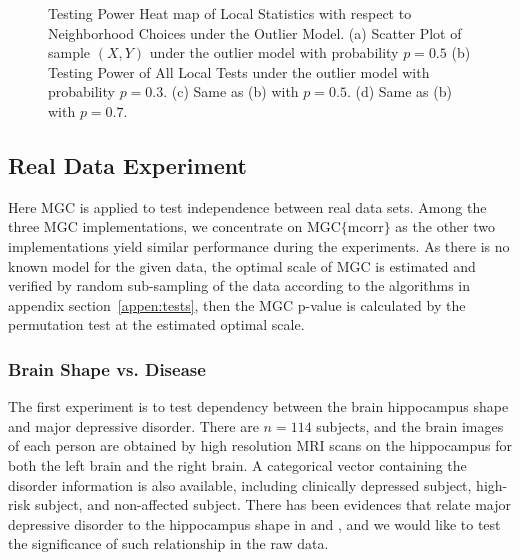 \documentclass[11pt]{article}
\begin{document}
\begin{figure}[htbp]
{}
\hfil
{}
\caption{Testing Power Heat map of Local Statistics with respect to Neighborhood Choices under the Outlier Model.
(a) Scatter Plot of sample $(X,Y)$ under the outlier model with probability $p=0.5$
(b) Testing Power of All Local Tests under the outlier model with probability $p=0.3$.
(c) Same as (b) with $p=0.5$.
(d) Same as (b) with $p=0.7$.
}
\label{figSim3}
\end{figure}

\subsection{Real Data Experiment}
\label{numer3}
Here MGC is applied to test independence between real data sets. Among the three MGC implementations, we concentrate on MGC$\{$mcorr$\}$ as the other two implementations yield similar performance during the experiments. As there is no known model for the given data, the optimal scale of MGC is estimated and verified by random sub-sampling of the data according to the algorithms in appendix section~\ref{appen:tests}, then the MGC p-value is calculated by the permutation test at the estimated optimal scale.

\subsubsection{Brain Shape vs. Disease}

The first experiment is to test dependency between the brain hippocampus shape and major depressive disorder. There are $n=114$ subjects, and the brain images of each person are obtained by high resolution MRI scans on the hippocampus for both the left brain and the right brain. A categorical vector containing the disorder information is also available, including clinically depressed subject, high-risk subject, and non-affected subject. There has been evidences that relate major depressive disorder to the hippocampus shape in \cite{ParkEtAl2011} and \cite{PosenerEtAl2003}, and we would like to test the significance of such relationship in the raw data. 
\end{document}
